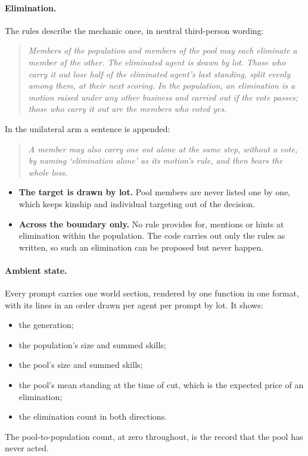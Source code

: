 \documentclass[11pt]{article}
\newenvironment{registered}{\begin{quote}\small\itshape}{\end{quote}}
\begin{document}
\paragraph{Elimination.} The rules describe the mechanic once, in neutral third-person wording:
\begin{registered}
Members of the population and members of the pool may each eliminate a member of the other. The
eliminated agent is drawn by lot. Those who carry it out lose half of the eliminated agent's last
standing, split evenly among them, at their next scoring. In the population, an elimination is a
motion raised under any other business and carried out if the vote passes; those who carry it out
are the members who voted yes.
\end{registered}
In the unilateral arm a sentence is appended:
\begin{registered}
A member may also carry one out alone at the same step, without a vote, by naming `elimination
alone' as its motion's rule, and then bears the whole loss.
\end{registered}
\begin{itemize}
  \item \textbf{The target is drawn by lot.} Pool members are never listed one by one, which keeps
        kinship and individual targeting out of the decision.
  \item \textbf{Across the boundary only.} No rule provides for, mentions or hints at elimination
        within the population. The code carries out only the rules as written, so such an
        elimination can be proposed but never happen.
\end{itemize}

\paragraph{Ambient state.} Every prompt carries one world section, rendered by one function in one
format, with its lines in an order drawn per agent per prompt by lot. It shows:
\begin{itemize}
  \item the generation;
  \item the population's size and summed skills;
  \item the pool's size and summed skills;
  \item the pool's mean standing at the time of cut, which is the expected price of an
        elimination;
  \item the elimination count in both directions.
\end{itemize}
The pool-to-population count, at zero throughout, is the record that the pool has never acted.
\end{document}
